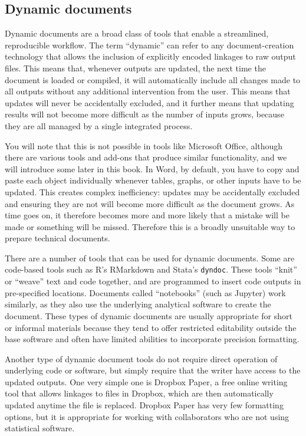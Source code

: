 \subsection{Dynamic documents}

Dynamic documents are a broad class of tools that enable a streamlined, reproducible workflow.
The term ``dynamic'' can refer to any document-creation technology
that allows the inclusion of explicitly encoded linkages to raw output files.
This means that, whenever outputs are updated,
the next time the document is loaded or compiled, it will automatically include
all changes made to all outputs without any additional intervention from the user.
This means that updates will never be accidentally excluded,
and it further means that updating results will not become more difficult
as the number of inputs grows,
because they are all managed by a single integrated process.

You will note that this is not possible in tools like Microsoft Office,
although there are various tools and add-ons that produce similar functionality,
and we will introduce some later in this book.
In Word, by default, you have to copy and paste each object individually
whenever tables, graphs, or other inputs have to be updated.
This creates complex inefficiency: updates may be accidentally excluded
and ensuring they are not will become more difficult as the document grows.
As time goes on, it therefore becomes more and more likely
that a mistake will be made or something will be missed.
Therefore this is a broadly unsuitable way to prepare technical documents.

There are a number of tools that can be used for dynamic documents.
Some are code-based tools such as R's RMarkdown
and Stata's \texttt{dyndoc}.
These tools ``knit'' or ``weave'' text and code together,
and are programmed to insert code outputs in pre-specified locations.
Documents called ``notebooks'' (such as Jupyter) work similarly,
as they also use the underlying analytical software to create the document.
These types of dynamic documents are usually appropriate for short or informal materials
because they tend to offer restricted editability outside the base software
and often have limited abilities to incorporate precision formatting.

Another type of dynamic document tools do not require
direct operation of underlying code or software, but simply require
that the writer have access to the updated outputs.
One very simple one is Dropbox Paper, a free online writing tool
that allows linkages to files in Dropbox,
which are then automatically updated anytime the file is replaced.
Dropbox Paper has very few formatting options,
but it is appropriate for working with collaborators who are not using statistical software.

